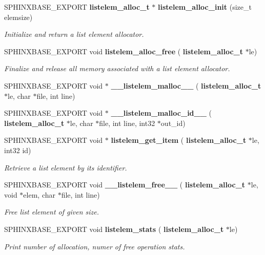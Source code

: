 \begin{DoxyCompactItemize}
\item 
\mbox{\label{listelem__alloc_8h_a4b08b49eaa74cbe9a3c95170cee78de7}} 
S\+P\+H\+I\+N\+X\+B\+A\+S\+E\+\_\+\+E\+X\+P\+O\+RT \textbf{ listelem\+\_\+alloc\+\_\+t} $\ast$ \textbf{ listelem\+\_\+alloc\+\_\+init} (size\+\_\+t elemsize)
\begin{DoxyCompactList}\small\item\em Initialize and return a list element allocator. \end{DoxyCompactList}\item 
\mbox{\label{listelem__alloc_8h_a94c02e93a0abaa2bd79636cbac6cced2}} 
S\+P\+H\+I\+N\+X\+B\+A\+S\+E\+\_\+\+E\+X\+P\+O\+RT void \textbf{ listelem\+\_\+alloc\+\_\+free} (\textbf{ listelem\+\_\+alloc\+\_\+t} $\ast$le)
\begin{DoxyCompactList}\small\item\em Finalize and release all memory associated with a list element allocator. \end{DoxyCompactList}\item 
\mbox{\label{listelem__alloc_8h_a04e5512f4dcedc2e84e58108bf61f1ff}} 
S\+P\+H\+I\+N\+X\+B\+A\+S\+E\+\_\+\+E\+X\+P\+O\+RT void $\ast$ {\bfseries \+\_\+\+\_\+listelem\+\_\+malloc\+\_\+\+\_\+} (\textbf{ listelem\+\_\+alloc\+\_\+t} $\ast$le, char $\ast$file, int line)
\item 
\mbox{\label{listelem__alloc_8h_a45f35edbe5f23773b1624f2ca2ac5e86}} 
S\+P\+H\+I\+N\+X\+B\+A\+S\+E\+\_\+\+E\+X\+P\+O\+RT void $\ast$ {\bfseries \+\_\+\+\_\+listelem\+\_\+malloc\+\_\+id\+\_\+\+\_\+} (\textbf{ listelem\+\_\+alloc\+\_\+t} $\ast$le, char $\ast$file, int line, int32 $\ast$out\+\_\+id)
\item 
\mbox{\label{listelem__alloc_8h_a74e610ac90e2b0696b2aedef4289d8f3}} 
S\+P\+H\+I\+N\+X\+B\+A\+S\+E\+\_\+\+E\+X\+P\+O\+RT void $\ast$ \textbf{ listelem\+\_\+get\+\_\+item} (\textbf{ listelem\+\_\+alloc\+\_\+t} $\ast$le, int32 id)
\begin{DoxyCompactList}\small\item\em Retrieve a list element by its identifier. \end{DoxyCompactList}\item 
\mbox{\label{listelem__alloc_8h_ab83a7a6fd086c14140ad2c8c4162709b}} 
S\+P\+H\+I\+N\+X\+B\+A\+S\+E\+\_\+\+E\+X\+P\+O\+RT void \textbf{ \+\_\+\+\_\+listelem\+\_\+free\+\_\+\+\_\+} (\textbf{ listelem\+\_\+alloc\+\_\+t} $\ast$le, void $\ast$elem, char $\ast$file, int line)
\begin{DoxyCompactList}\small\item\em Free list element of given size. \end{DoxyCompactList}\item 
\mbox{\label{listelem__alloc_8h_a838d9361ba76a89a834a7ea6a185b57d}} 
S\+P\+H\+I\+N\+X\+B\+A\+S\+E\+\_\+\+E\+X\+P\+O\+RT void \textbf{ listelem\+\_\+stats} (\textbf{ listelem\+\_\+alloc\+\_\+t} $\ast$le)
\begin{DoxyCompactList}\small\item\em Print number of allocation, numer of free operation stats. \end{DoxyCompactList}\end{DoxyCompactItemize}


